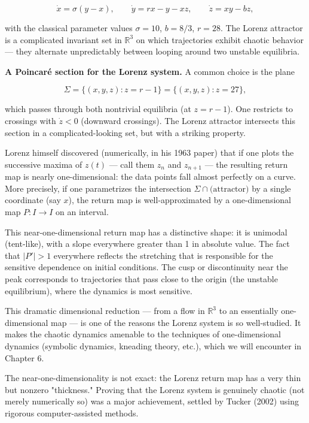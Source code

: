 \[
\dot{x} = \sigma(y - x), \qquad \dot{y} = rx - y - xz, \qquad \dot{z} = xy - bz,
\]

with the classical parameter values $\sigma = 10$, $b = 8/3$, $r = 28$. The Lorenz attractor is a complicated invariant set in $\mathbb{R}^3$ on which trajectories exhibit chaotic behavior --- they alternate unpredictably between looping around two unstable equilibria.

\textbf{A Poincaré section for the Lorenz system.} A common choice is the plane

\[
\Sigma = \{(x, y, z) : z = r - 1\} = \{(x, y, z) : z = 27\},
\]

which passes through both nontrivial equilibria (at $z = r - 1$). One restricts to crossings with $\dot{z} < 0$ (downward crossings). The Lorenz attractor intersects this section in a complicated-looking set, but with a striking property.

Lorenz himself discovered (numerically, in his 1963 paper) that if one plots the successive maxima of $z(t)$ --- call them $z_n$ and $z_{n+1}$ --- the resulting return map is nearly one-dimensional: the data points fall almost perfectly on a curve. More precisely, if one parametrizes the intersection $\Sigma \cap \text{(attractor)}$ by a single coordinate (say $x$), the return map is well-approximated by a one-dimensional map $P: I \to I$ on an interval.

This near-one-dimensional return map has a distinctive shape: it is unimodal (tent-like), with a slope everywhere greater than 1 in absolute value. The fact that $|P'| > 1$ everywhere reflects the stretching that is responsible for the sensitive dependence on initial conditions. The cusp or discontinuity near the peak corresponds to trajectories that pass close to the origin (the unstable equilibrium), where the dynamics is most sensitive.

This dramatic dimensional reduction --- from a flow in $\mathbb{R}^3$ to an essentially one-dimensional map --- is one of the reasons the Lorenz system is so well-studied. It makes the chaotic dynamics amenable to the techniques of one-dimensional dynamics (symbolic dynamics, kneading theory, etc.), which we will encounter in Chapter 6.

\begin{remark}
The near-one-dimensionality is not exact: the Lorenz return map has a very thin but nonzero "thickness." Proving that the Lorenz system is genuinely chaotic (not merely numerically so) was a major achievement, settled by Tucker (2002) using rigorous computer-assisted methods.
\end{remark}


